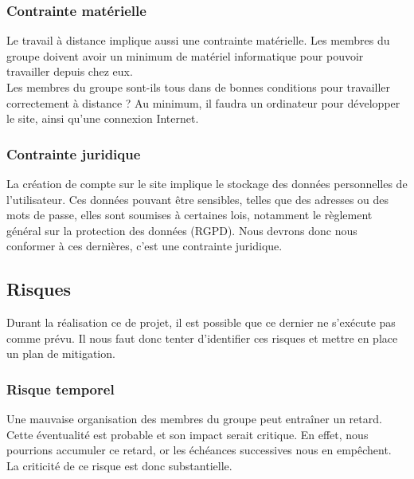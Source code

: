 \documentclass[a4paper,11pt]{article}
\begin{document}
\subsubsection{Contrainte matérielle}

Le travail à distance implique aussi une contrainte matérielle. Les membres du groupe doivent
avoir un minimum de matériel informatique pour pouvoir travailler depuis chez eux.\\

Les membres du groupe sont-ils tous dans de bonnes conditions pour travailler correctement à
distance ? Au minimum, il faudra un ordinateur pour développer le site, ainsi qu’une connexion
Internet.\\

\subsubsection{Contrainte juridique}

La création de compte sur le site implique le stockage des données personnelles de l’utilisateur. Ces
données pouvant être sensibles, telles que des adresses ou des mots de passe, elles sont soumises à
certaines lois, notamment le règlement général sur la protection des données (RGPD). Nous devrons donc nous
conformer à ces dernières, c'est une contrainte juridique.\\

\pagebreak

\subsection{Risques}

Durant la réalisation ce de projet, il est possible que ce dernier ne s’exécute pas comme prévu. Il nous
faut donc tenter d’identifier ces risques et mettre en place un plan de mitigation.\\

\subsubsection{Risque temporel}

Une mauvaise organisation des membres du groupe peut entraîner un retard. Cette éventualité est
probable et son impact serait critique. En effet, nous pourrions accumuler ce retard, or les échéances
successives nous en empêchent. La criticité de ce risque est donc substantielle.\\
\end{document}
